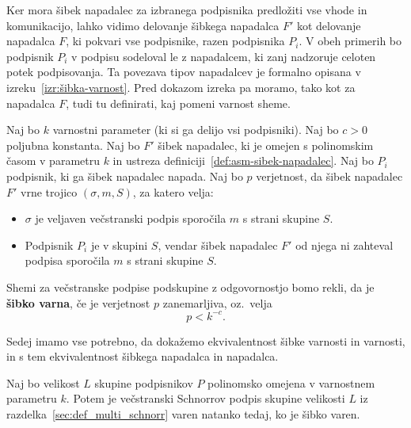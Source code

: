 \documentclass[isrm2, tisk]{fmfdelo}
\begin{document}
Ker mora šibek napadalec za izbranega podpisnika predložiti vse vhode in komunikacijo, lahko vidimo
delovanje šibkega napadalca $F'$ kot delovanje napadalca $F$, ki pokvari vse podpisnike, razen
podpisnika $P_i$. V obeh primerih bo podpisnik $P_i$ v podpisu sodeloval le z napadalcem, ki zanj
nadzoruje celoten potek podpisovanja. Ta povezava tipov napadalcev je formalno opisana v
izreku~\ref{izr:šibka-varnost}. Pred dokazom izreka pa moramo, tako kot za napadalca $F$, tudi tu
definirati, kaj pomeni varnost sheme.

\begin{definicija}
    Naj bo $k$ varnostni parameter (ki si ga delijo vsi podpisniki). Naj bo $c > 0$ poljubna konstanta. 
    Naj bo $F'$ šibek napadalec, ki je omejen s polinomskim časom v parametru $k$ in ustreza
    definiciji~\ref{def:asm-sibek-napadalec}. Naj bo $P_i$ podpisnik, ki ga šibek napadalec napada.
    Naj bo $p$ verjetnost, da šibek napadalec $F'$ vrne trojico $(\sigma, m, S)$, za katero velja: 
    \begin{itemize}
        \item $\sigma$ je veljaven večstranski podpis sporočila $m$ s strani skupine $S$.
        \item Podpisnik $P_i$ je v skupini $S$, vendar šibek napadalec $F'$ od njega ni zahteval
            podpisa sporočila $m$ s strani skupine $S$.
    \end{itemize}
    Shemi za večstranske podpise podskupine z odgovornostjo bomo rekli, da je \textbf{šibko varna},
    če je verjetnost $p$ zanemarljiva, oz.\ velja 
    $$ 
    p < k^{-c}.
    $$
\end{definicija}

Sedej imamo vse potrebno, da dokažemo ekvivalentnost šibke varnosti in varnosti, in s tem
ekvivalentnost šibkega napadalca in napadalca.

\begin{izrek}
\label{izr:šibka-varnost}
    Naj bo velikost $L$ skupine podpisnikov $P$ polinomsko omejena v varnostnem parametru $k$.
    Potem je večstranski Schnorrov podpis skupine velikosti $L$ iz razdelka~\ref{sec:def_multi_schnorr}
    varen natanko tedaj, ko je šibko varen.
\end{izrek}
\end{document}
